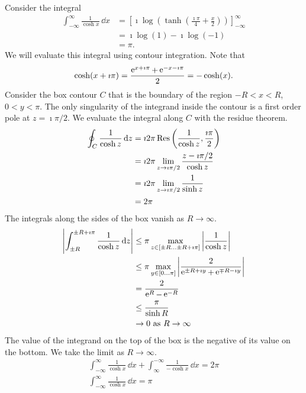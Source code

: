\begin{Example}
  Consider the integral
  \begin{align*}
    \int_{-\infty}^\infty \frac{1}{\cosh x} \,\dd x
    &= \left[ \imath \log \left( \tanh \left( \frac{\imath \pi}{4} + \frac{x}{2}
        \right) \right) \right]_{-\infty}^\infty \\
    &= \imath \log(1) - \imath \log(-1) \\
    &= \pi.
  \end{align*}
  We will evaluate this integral using contour integration.  Note that
  \[
  \cosh(x + \imath \pi) = \frac{\mathop{\mathrm{e}}\nolimits^{x + \imath \pi} + \mathop{\mathrm{e}}\nolimits^{-x - \imath \pi}}{2} = - \cosh(x).
  \]
  Consider the box contour $C$ that is the boundary of the region
  $-R < x < R$, $0 < y < \pi$.   The only singularity of the 
  integrand inside the contour is a first order pole at $z = \imath \pi / 2$.
  We evaluate the integral along $C$ with the residue theorem.
  \begin{align*}
    \oint_C \frac{1}{\cosh z} \,\mathrm{d} z
    &= \imath 2 \pi \mathop{\mathrm{Res}}\nolimits \left( \frac{1}{\cosh z}, \frac{\imath \pi}{2} \right) \\
    &= \imath 2 \pi \lim_{z \to \imath \pi/2} \frac{z - \imath \pi/2}{\cosh z} \\
    &= \imath 2 \pi \lim_{z \to \imath \pi/2} \frac{1}{\sinh z} \\
    &= 2 \pi
  \end{align*}
  The integrals along the sides of the box vanish as $R \to \infty$.
  \begin{align*}
    \left| \int_{\pm R}^{\pm R + \imath \pi} \frac{1}{\cosh z} \,\mathrm{d} z \right|
    &\leq \pi \max_{z \in [\pm R \ldots \pm R+\imath \pi]} 
    \left| \frac{1}{\cosh z} \right| \\
    &\leq \pi \max_{y \in [0 \ldots \pi]} 
    \left| \frac{2}{\mathop{\mathrm{e}}\nolimits^{\pm R + \imath y} + \mathop{\mathrm{e}}\nolimits^{\mp R - \imath y}} \right| \\
    &= \frac{2}{\mathop{\mathrm{e}}\nolimits^R - \mathop{\mathrm{e}}\nolimits^{-R}} \\
    &\leq \frac{\pi}{\sinh R} \\
    &\to 0\ \mathrm{as}\ R \to \infty
  \end{align*}
  The value of the integrand on the top of the box is the negative of its 
  value on the bottom.   We take the limit as $R \to \infty$.
  \begin{gather*}
    \int_{-\infty}^\infty \frac{1}{\cosh x} \,\dd x 
    + \int_\infty^{-\infty} \frac{1}{-\cosh x} \,\dd x = 2 \pi \\
    \boxed{
      \int_{-\infty}^\infty \frac{1}{\cosh x} \,\dd x = \pi
      }
  \end{gather*}
\end{Example}






























